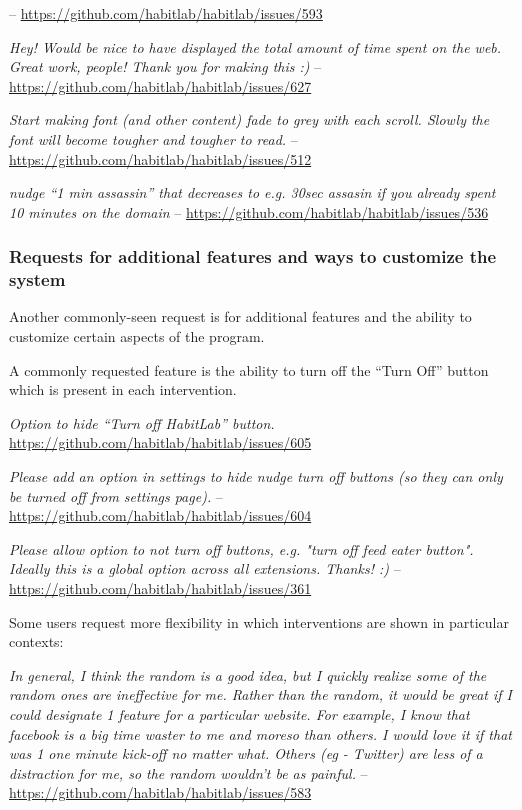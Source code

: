  -- \url{https://github.com/habitlab/habitlab/issues/593}

\textit{Hey! Would be nice to have displayed the total amount of time spent on the web. Great work, people! Thank you for making this :)} -- \url{https://github.com/habitlab/habitlab/issues/627}

\textit{Start making font (and other content) fade to grey with each scroll. Slowly the font will become tougher and tougher to read.} -- \url{https://github.com/habitlab/habitlab/issues/512}

\textit{nudge ``1 min assassin'' that decreases to e.g. 30sec assasin if you already spent 10 minutes on the domain} -- \url{https://github.com/habitlab/habitlab/issues/536}

\subsubsection{Requests for additional features and ways to customize the system}

Another commonly-seen request is for additional features and the ability to customize certain aspects of the program.

A commonly requested feature is the ability to turn off the ``Turn Off'' button which is present in each intervention.

\textit{Option to hide ``Turn off HabitLab'' button.} \url{https://github.com/habitlab/habitlab/issues/605}

\textit{Please add an option in settings to hide nudge turn off buttons (so they can only be turned off from settings page).} -- \url{https://github.com/habitlab/habitlab/issues/604}

\textit{Please allow option to not turn off buttons, e.g. "turn off feed eater button". Ideally this is a global option across all extensions. Thanks! :)} -- \url{https://github.com/habitlab/habitlab/issues/361}

Some users request more flexibility in which interventions are shown in particular contexts:

\textit{In general, I think the random is a good idea, but I quickly realize some of the random ones are ineffective for me. Rather than the random, it would be great if I could designate 1 feature for a particular website. For example, I know that facebook is a big time waster to me and moreso than others. I would love it if that was 1 one minute kick-off no matter what. Others (eg - Twitter) are less of a distraction for me, so the random wouldn't be as painful.} -- \url{https://github.com/habitlab/habitlab/issues/583}

